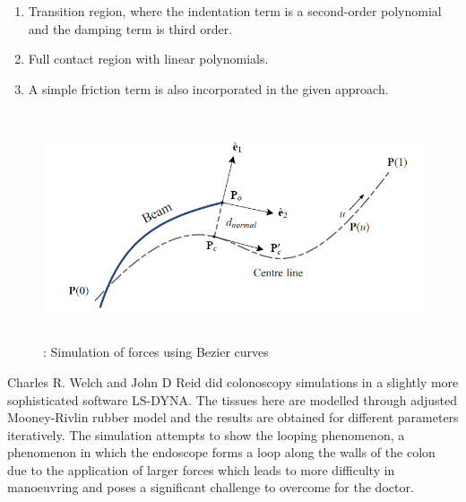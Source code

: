 \documentclass[12pt]{report}
\begin{document}
\begin{enumerate}
	\item Transition region, where the indentation term is a second-order polynomial and the damping term is third order.\par

	\item Full contact region with linear polynomials. \par

	\item A simple friction term is also incorporated in the given approach. 
\end{enumerate}\par




\begin{figure}[H]
	\begin{Center}
		\includegraphics[width=5.11in,height=2.66in]{./media/image3.png}
		\caption{: Simulation of forces using Bezier curves}
		\label{fig:_Simulation_of_forces_using_Bezier_curves}
	\end{Center}
\end{figure}



\par

\par

Charles R. Welch and John D Reid did colonoscopy simulations in a slightly more sophisticated software LS-DYNA. The tissues here are modelled through adjusted Mooney-Rivlin rubber model and the results are obtained for different parameters iteratively. The simulation attempts to show the looping phenomenon, a phenomenon in which the endoscope forms a loop along the walls of the colon due to the application of larger forces which leads to more difficulty in manoeuvring and poses a significant challenge to overcome for the doctor.\par
\end{document}
